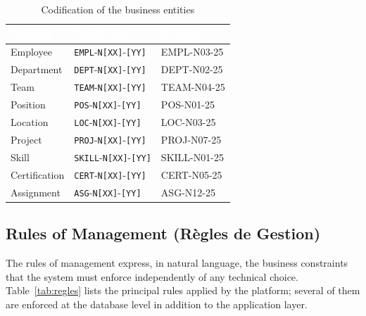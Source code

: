 \documentclass{bts-report}
\begin{document}
\begin{table}[H]
  \centering
  \caption{Codification of the business entities}
  \label{tab:codification}
  \begin{tabularx}{\textwidth}{|p{4cm}|X|p{3cm}|}
    \hline
    \rowcolor{tableheader}
    \textcolor{white}{\textbf{Element}} & \textcolor{white}{\textbf{Signification}} & \textcolor{white}{\textbf{Example}} \\
    \hline
    Employee & \texttt{EMPL}-\texttt{N[XX]}-\texttt{[YY]} & EMPL-N03-25 \\ \hline
    Department & \texttt{DEPT}-\texttt{N[XX]}-\texttt{[YY]} & DEPT-N02-25 \\ \hline
    Team & \texttt{TEAM}-\texttt{N[XX]}-\texttt{[YY]} & TEAM-N04-25 \\ \hline
    Position & \texttt{POS}-\texttt{N[XX]}-\texttt{[YY]} & POS-N01-25 \\ \hline
    Location & \texttt{LOC}-\texttt{N[XX]}-\texttt{[YY]} & LOC-N03-25 \\ \hline
    Project & \texttt{PROJ}-\texttt{N[XX]}-\texttt{[YY]} & PROJ-N07-25 \\ \hline
    Skill & \texttt{SKILL}-\texttt{N[XX]}-\texttt{[YY]} & SKILL-N01-25 \\ \hline
    Certification & \texttt{CERT}-\texttt{N[XX]}-\texttt{[YY]} & CERT-N05-25 \\ \hline
    Assignment & \texttt{ASG}-\texttt{N[XX]}-\texttt{[YY]} & ASG-N12-25 \\ \hline
  \end{tabularx}
\end{table}

\subsection{Rules of Management (R\`egles de Gestion)}
The rules of management express, in natural language, the business constraints that the system must enforce independently of any technical choice. Table~\ref{tab:regles} lists the principal rules applied by the platform; several of them are enforced at the database level in addition to the application layer.
\end{document}
